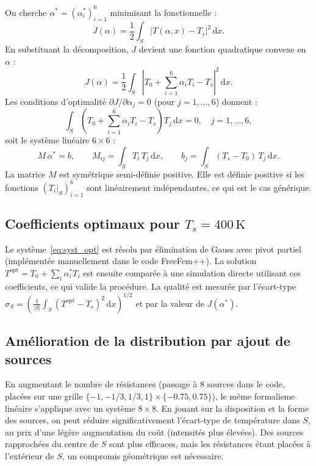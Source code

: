 \documentclass[11pt,a4paper]{article}
\newcommand{\dd}{\,\mathrm{d}}
\begin{document}
On cherche $\alpha^* = (\alpha_i^*)_{i=1}^6$ minimisant la fonctionnelle :
\[
J(\alpha) = \frac{1}{2}\int_S |T(\alpha,x) - T_s|^2\dd x.
\]
En substituant la décomposition, $J$ devient une fonction quadratique convexe en $\alpha$ :
\[
J(\alpha) = \frac{1}{2}\int_S \left|T_0 + \sum_{i=1}^6 \alpha_i T_i - T_s\right|^2\dd x.
\]
Les conditions d'optimalité $\partial J/\partial \alpha_j = 0$ (pour $j=1,\ldots,6$) donnent :
\[
\int_S \left(T_0 + \sum_{i=1}^6 \alpha_i T_i - T_s\right)T_j\dd x = 0, \quad j = 1,\ldots,6,
\]
soit le système linéaire $6\times 6$ :
\begin{equation}\label{eq:syst_opt}
\boxed{M\,\alpha^* = b, \qquad M_{ij} = \int_S T_i\,T_j\dd x, \qquad b_j = \int_S (T_s - T_0)\,T_j\dd x.}
\end{equation}
La matrice $M$ est symétrique semi-définie positive. Elle est définie positive si les fonctions $(T_i|_S)_{i=1}^6$ sont linéairement indépendantes, ce qui est le cas générique.

\subsection{Coefficients optimaux pour $T_s = 400\,\mathrm{K}$}

Le système~\eqref{eq:syst_opt} est résolu par élimination de Gauss avec pivot partiel (implémentée manuellement dans le code FreeFem++). La solution $T^{\text{opt}} = T_0 + \sum_i \alpha_i^* T_i$ est ensuite comparée à une simulation directe utilisant ces coefficients, ce qui valide la procédure. La qualité est mesurée par l'écart-type $\sigma_S = \left(\frac{1}{|S|}\int_S (T^{\text{opt}} - T_s)^2\dd x\right)^{1/2}$ et par la valeur de $J(\alpha^*)$.

\subsection{Amélioration de la distribution par ajout de sources}

En augmentant le nombre de résistances (passage à 8 sources dans le code, placées sur une grille $\{-1, -1/3, 1/3, 1\} \times \{-0.75, 0.75\}$), le même formalisme linéaire s'applique avec un système $8\times8$. En jouant sur la disposition et la forme des sources, on peut réduire significativement l'écart-type de température dans $S$, au prix d'une légère augmentation du coût (intensités plus élevées). Des sources rapprochées du centre de $S$ sont plus efficaces, mais les résistances étant placées à l'extérieur de $S$, un compromis géométrique est nécessaire.
\end{document}
